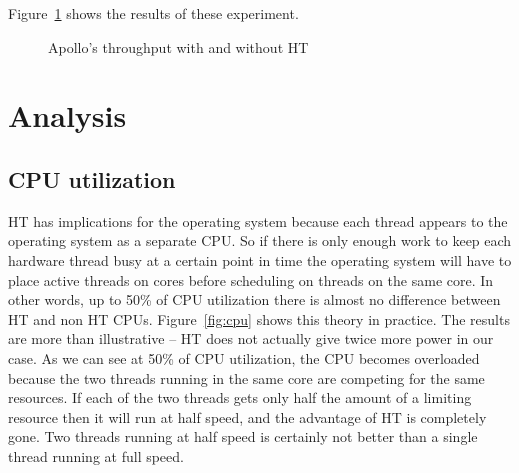 \documentclass[12pt]{article}
\begin{document}
Figure~\ref{fig:load} shows the results of these experiment. 

\begin{figure}[h]
    \centering
	\caption{Apollo's throughput with and without HT}
    \label{fig:load}
\end{figure}

\section{Analysis}

\subsection{CPU utilization}

HT has implications for the operating system because each thread appears to the operating system as a separate CPU. So if there is only enough work to keep each hardware thread busy at a certain point in time the operating system will have to place active threads on cores before scheduling on threads on the same core. In other words, up to 50\% of CPU utilization there is almost no difference between HT and non HT CPUs. Figure~\ref{fig:cpu} shows this theory in practice. The results are more than illustrative -- HT does not actually give twice more power in our case. As we can see at 50\% of CPU utilization, the CPU becomes overloaded because the two threads running in the same core are competing for the same resources. If each of the two threads gets only half the amount of a limiting resource then it will run at half speed, and the advantage of HT is completely gone. Two threads running at half speed is certainly not better than a single thread running at full speed.
\end{document}
